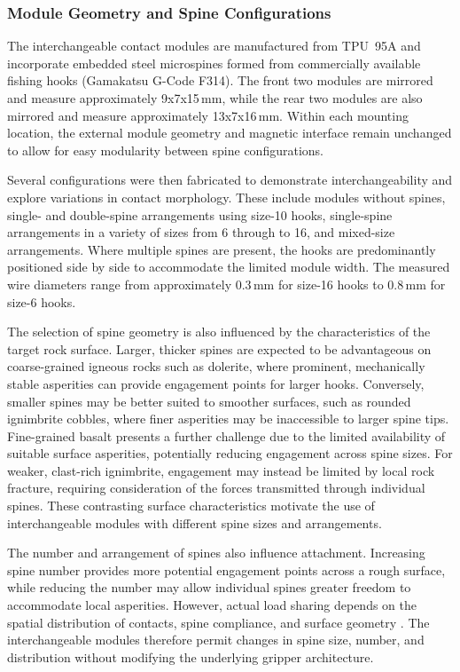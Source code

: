 \documentclass[letterpaper, 10 pt, conference, twoside]{ieeetran}
\begin{document}
\subsubsection{Module Geometry and Spine Configurations}

The interchangeable contact modules are manufactured
from TPU~95A and incorporate embedded steel microspines formed from commercially available fishing hooks (Gamakatsu G-Code F314). The front two  modules are mirrored and measure approximately 9x7x15\,mm, while the rear two modules are also mirrored and measure approximately 13x7x16\,mm. Within each mounting location, the external module geometry and magnetic interface remain unchanged  to allow for easy modularity between spine configurations.

Several configurations were then fabricated to demonstrate interchangeability and explore variations in contact morphology. These include modules without spines, single- and double-spine arrangements using size-10 hooks, single-spine arrangements in a variety of sizes from 6 through to 16, and mixed-size arrangements. Where multiple spines are present, the hooks are predominantly positioned side by side to accommodate the limited module width. The measured wire diameters range from approximately 0.3\,mm for size-16 hooks to 0.8\,mm for size-6 hooks.


The selection of spine geometry is also influenced by the characteristics of the target rock surface. Larger, thicker spines are expected to be advantageous on coarse-grained igneous rocks such as dolerite, where prominent, mechanically stable asperities can provide engagement points for larger hooks. Conversely, smaller spines may be better suited to smoother surfaces, such as rounded ignimbrite cobbles, where finer asperities may be inaccessible to larger spine tips. Fine-grained basalt presents a further challenge due to the limited availability of suitable surface asperities, potentially reducing engagement across spine sizes. For weaker, clast-rich ignimbrite, engagement may instead be limited by local rock fracture, requiring consideration of the forces transmitted through individual spines. These contrasting surface characteristics motivate the use of interchangeable modules with different spine sizes and arrangements.

The number and arrangement of spines also influence attachment. Increasing spine number provides more potential engagement points across a rough surface, while reducing the number may allow individual spines greater freedom to accommodate local asperities. However, actual load sharing depends on the spatial distribution of contacts, spine compliance, and surface geometry \cite{Jiang2018StochasticModels}. The interchangeable modules therefore permit changes in spine size, number, and distribution without modifying the underlying gripper architecture.
\end{document}
